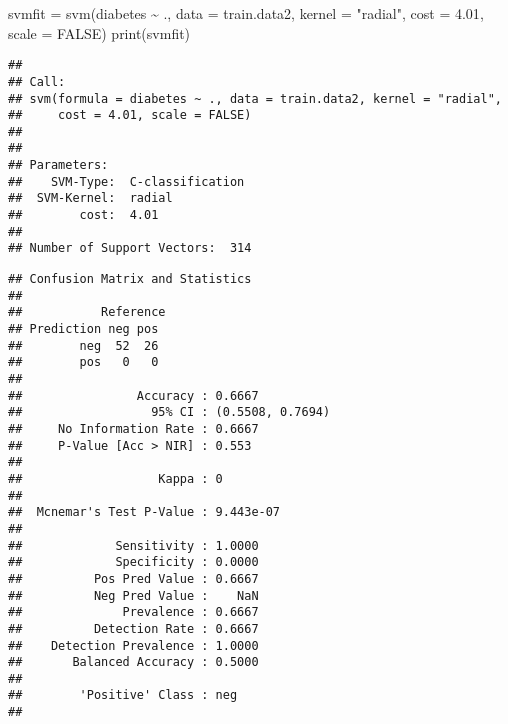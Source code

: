 \documentclass[
]{article}
\newenvironment{Shaded}{\begin{snugshade}}{\end{snugshade}}
\newcommand{\AttributeTok}[1]{\textcolor[rgb]{0.77,0.63,0.00}{#1}}
\newcommand{\ConstantTok}[1]{\textcolor[rgb]{0.00,0.00,0.00}{#1}}
\newcommand{\FloatTok}[1]{\textcolor[rgb]{0.00,0.00,0.81}{#1}}
\newcommand{\FunctionTok}[1]{\textcolor[rgb]{0.00,0.00,0.00}{#1}}
\newcommand{\NormalTok}[1]{#1}
\newcommand{\OtherTok}[1]{\textcolor[rgb]{0.56,0.35,0.01}{#1}}
\newcommand{\SpecialCharTok}[1]{\textcolor[rgb]{0.00,0.00,0.00}{#1}}
\newcommand{\StringTok}[1]{\textcolor[rgb]{0.31,0.60,0.02}{#1}}
\begin{document}
\begin{Shaded}
\begin{Highlighting}[]
\NormalTok{svmfit }\OtherTok{=} \FunctionTok{svm}\NormalTok{(diabetes }\SpecialCharTok{\textasciitilde{}}\NormalTok{ ., }\AttributeTok{data =}\NormalTok{ train.data2, }\AttributeTok{kernel =} \StringTok{"radial"}\NormalTok{, }\AttributeTok{cost =} \FloatTok{4.01}\NormalTok{, }\AttributeTok{scale =} \ConstantTok{FALSE}\NormalTok{)}
\FunctionTok{print}\NormalTok{(svmfit)}
\end{Highlighting}
\end{Shaded}

\begin{verbatim}
## 
## Call:
## svm(formula = diabetes ~ ., data = train.data2, kernel = "radial", 
##     cost = 4.01, scale = FALSE)
## 
## 
## Parameters:
##    SVM-Type:  C-classification 
##  SVM-Kernel:  radial 
##        cost:  4.01 
## 
## Number of Support Vectors:  314
\end{verbatim}

\begin{Shaded}
\end{Shaded}

\begin{verbatim}
## Confusion Matrix and Statistics
## 
##           Reference
## Prediction neg pos
##        neg  52  26
##        pos   0   0
##                                           
##                Accuracy : 0.6667          
##                  95% CI : (0.5508, 0.7694)
##     No Information Rate : 0.6667          
##     P-Value [Acc > NIR] : 0.553           
##                                           
##                   Kappa : 0               
##                                           
##  Mcnemar's Test P-Value : 9.443e-07       
##                                           
##             Sensitivity : 1.0000          
##             Specificity : 0.0000          
##          Pos Pred Value : 0.6667          
##          Neg Pred Value :    NaN          
##              Prevalence : 0.6667          
##          Detection Rate : 0.6667          
##    Detection Prevalence : 1.0000          
##       Balanced Accuracy : 0.5000          
##                                           
##        'Positive' Class : neg             
## 
\end{verbatim}
\end{document}
